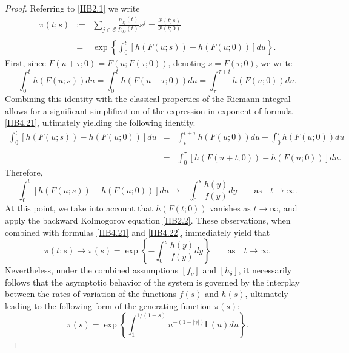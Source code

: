 \documentclass[10pt,reqno]{amsart}
\theoremstyle{definition}
\numberwithin{equation}{section}
\begin{document}
\begin{proof}
    Referring to {\eqref{IIB2.1}} we write
\begin{eqnarray}                \label{IIB4.21}
    {\pi(t;s)}
& := & \sum_{j\in\mathcal{E}}{\frac{{p_{0j}}(t)}{{p_{00}}(t)}{s^{j}}}
        =\frac{\mathcal{P}(t;s)}{\mathcal{P}(t;0)} \nonumber\\
\ \nonumber\\
& = & \exp\left\{\int_{0}^{t}{\left[h\left(F(u;s)\right)-h\left(F(u;0)\right)\right]du}\right\}.
\end{eqnarray}
    First, since $F(u+\tau;0)=F(u;F(\tau;0))$, denoting $s=F(\tau;0)$, we write
\[
    \int_{0}^{t}{h\left(F(u;s)\right)du}=\int_{0}^{t}{h\left(F(u+\tau;0)\right)du}
    =\int_{\tau}^{\tau+t}{h\left(F(u;0)\right)du}.
\]
    Combining this identity with the classical properties of the Riemann integral allows for a significant
    simplification of the expression in exponent of formula {\eqref{IIB4.21}}, ultimately yielding the following identity.
\begin{eqnarray*}
    {\int_{0}^{t}{\left[h(F(u;s))-h(F(u;0))\right]du}}
& = & \int_{t}^{t+\tau}{h(F(u;0))du}-\int_{0}^{\tau}{h(F(u;0))du} \nonumber\\
\ \nonumber\\
& = & \int_{0}^{\tau}{\left[h(F(u+t;0))-h(F(u;0))\right]du}.
\end{eqnarray*}
    Therefore,
\begin{equation}                \label{IIB4.22}
    \int_{0}^{t}{\left[ h(F(u;s))-h(F(u;0))\right]du} \to
    -\int_{0}^{s}{\frac{h(y)}{f(y)}dy}  \qquad {\text{as}} \quad {t\to\infty}.
\end{equation}
    At this point, we take into account that $h(F(t;0))$ vanishes as $t\to\infty$, and apply the backward
    Kolmogorov equation {\eqref{IIB2.2}}. These observations, when combined with formulas {\eqref{IIB4.21}}
    and {\eqref{IIB4.22}}, immediately yield that
\[
    \pi(t;s)\to \pi(s)=\exp\left\{-\int_{0}^{s}{\frac{h(y)}{f(y)}dy}\right\}
    \qquad {\text{as}} \quad {t\to\infty}.
\]
    Nevertheless, under the combined assumptions $[{f_{\nu}}]$ and $[{h_{\delta}}]$, it necessarily follows
    that the asymptotic behavior of the system is governed by the interplay between the rates of variation of
    the functions $f(s)$ and $h(s)$, ultimately leading to the following form of the generating function $\pi(s)$:
\begin{equation}                \label{IIB4.23}
    \pi(s)=\exp\left\{\int_{1}^{{1}/{(1-s)}}{{u^{-(1-|\gamma|)}}\textsf{L}(u)du}\right\}.

\end{equation}
\end{proof}
\end{document}
